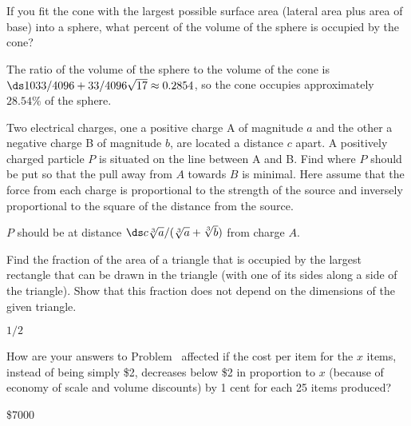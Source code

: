 \begin{exercises}
\begin{exercise}
If you fit the cone with the largest possible surface area (lateral area
plus area of base) into a sphere, what percent of the volume of the
sphere is occupied by the cone?  
\begin{answer} The ratio of the volume of the sphere to the volume of the
cone is $\ds 1033/4096+33/4096\sqrt{17}\approx 0.2854$, so the cone
occupies approximately $28.54\%$ of the sphere.
\end{answer}\end{exercise}

\begin{exercise}
Two electrical charges, one a positive charge A of magnitude $a$ and the
other a negative charge B of magnitude $b$, are located a distance $c$
apart.  A positively charged particle $P$ is situated on the line between A
and B.  Find where $P$ should be put so that the pull away from $A$ towards
$B$ is minimal.  Here assume that the force from each charge is
proportional to the strength of the source and inversely proportional to
the square of the distance from the source.
\begin{answer} $P$ should be at distance $\ds c\root 3\of {a} /
(\root 3\of {a} + \root 3\of {b})$ from charge $A$.
\end{answer}\end{exercise}

\begin{exercise}
Find the fraction of the area of a triangle that is occupied by the largest
rectangle that can be drawn in the triangle (with one of its sides along a
side of the triangle).  Show that this fraction does not depend on the
dimensions of the given triangle.
\begin{answer} $1/2$
\end{answer}\end{exercise}

\begin{exercise}
How are your answers to Problem~
 affected if the cost per item for the $x$
items, instead of being simply \$2, decreases below \$2 in proportion to
$x$ (because of economy of scale and volume discounts) by 1 cent for each
25 items produced?
\begin{answer} \$7000
\end{answer}\end{exercise}


\end{exercises}
